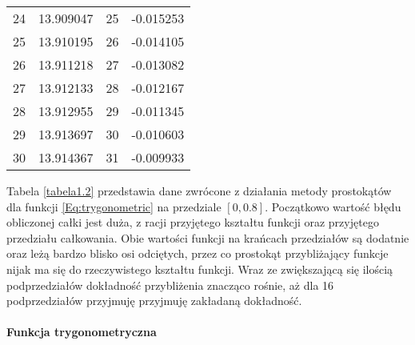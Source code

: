 \documentclass[12pt,twoside]{article}
\begin{document}
\begin{table}[H]
\begin{tabular}{lrrr}
24 &      13.909047 &      25 & -0.015253 \\
25 &      13.910195 &      26 & -0.014105 \\
26 &      13.911218 &      27 & -0.013082 \\
27 &      13.912133 &      28 & -0.012167 \\
28 &      13.912955 &      29 & -0.011345 \\
29 &      13.913697 &      30 & -0.010603 \\
30 &      13.914367 &      31 & -0.009933 \\
\bottomrule
\end{tabular}
\end{table}


Tabela \eqref{tabela1.2} przedstawia dane zwrócone z działania metody prostokątów dla funkcji \eqref{Eq:trygonometric} na przedziale $[0,0.8]$.
Początkowo wartość błędu obliczonej całki jest duża, z racji przyjętego kształtu funkcji oraz przyjętego przedziału całkowania. Obie wartości funkcji na krańcach przedziałów są dodatnie oraz leżą bardzo blisko osi odciętych, przez co prostokąt przybliżający funkcje nijak ma się do rzeczywistego kształtu funkcji. Wraz ze zwiększającą się ilością podprzedziałów dokładność przybliżenia znacząco rośnie, aż dla 16 podprzedziałów przyjmuję przyjmuję zakładaną dokładność.


\paragraph{Funkcja trygonometryczna}\mbox{} \\
\end{document}
